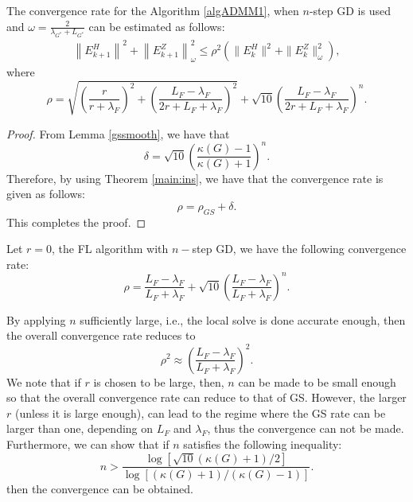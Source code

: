 \begin{theorem}\label{main:ngd}
The convergence rate for the Algorithm \ref{algADMM1}, when $n$-step GD is used and $\omega = \frac{2}{\lambda_{G^*} + L_{G^*}}$ can be estimated as follows: 
\begin{eqnarray*}
\left \|E_{k+1}^H \right \|^2 + \left \|E_{k+1}^Z \right \|_\omega^2 \leq \rho^2 \left ( \|E_k^H\|^2 + \|E_k^Z\|_\omega^2 \right ), 
\end{eqnarray*}
where 
\begin{equation}
\rho = \sqrt{ \left (\frac{r}{r+\lambda_F} \right )^2 + \left ( \frac{L_F - \lambda_F}{2r + L_F + \lambda_F } \right )^2  } + \sqrt{10} \left ( \frac{L_F - \lambda_F}{2r + L_F + \lambda_F } \right )^n.
\end{equation}
\end{theorem} 
\begin{proof}
From Lemma \ref{gssmooth}, we have that 
\begin{equation}
\delta = \sqrt{10} \left (\frac{\kappa(G) - 1}{\kappa(G) + 1} \right )^n.
\end{equation}
Therefore, by using Theorem \ref{main:ins}, we have that the convergence rate is given as follows:
\begin{equation}
\rho = \rho_{GS} + \delta. 
\end{equation}
This completes the proof. 
\end{proof}
\begin{corollary}
Let $r = 0$, the FL algorithm with $n-$step GD, we have the following convergence rate:
\begin{equation}
\rho = \frac{L_F - \lambda_F}{L_F + \lambda_F} + \sqrt{10} \left ( \frac{L_F - \lambda_F}{L_F + \lambda_F} \right )^n. 
\end{equation}
\end{corollary}
\begin{remark}
By applying $n$ sufficiently large, i.e., the local solve is done accurate enough, then the overall convergence rate reduces to 
\begin{equation}
\rho^2 \approx \left ( \frac{L_F - \lambda_F}{L_F + \lambda_F} \right )^2. 
\end{equation}
We note that if $r$ is chosen to be large, then, $n$ can be made to be small enough so that the overall convergence rate can reduce to that of GS. However, the larger $r$ (unless it is large enough), can lead to the regime where the GS rate can be larger than one, depending on $L_F$ and $\lambda_F$, thus the convergence can not be made. Furthermore, we can show that if $n$ satisfies the following inequality: 
\begin{equation}
n > \frac{\log[\sqrt{10}(\kappa(G) + 1)/2]}{\log[(\kappa(G) +1)/(\kappa(G) - 1)]}. 
\end{equation}
then the convergence can be obtained. 
\end{remark}

